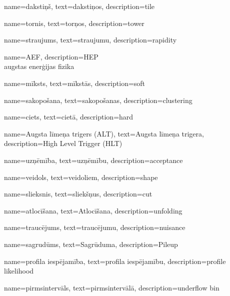 {
        name=dakstiņš,
        text=dakstiņos,
        description={tile}
}


{
        name=tornis,
        text=torņos,
        description={tower}
}


{
        name=straujums,
        text=straujumu,
        description={rapidity}
}

{
        name=AEF,
        description={HEP\\
        augstas enerģijas fizika}
}

{
        name=mīksts,
        text=mīkstās,
        description={soft}
}

{
        name=sakopošana,
        text=sakopošanas,
        description={clustering}
}

{
        name=ciets,
        text=cietā,
        description={hard}
}

{
        name=Augsta līmeņa trigers (ALT),
        text=Augsta līmeņa trigera,
        description={High Level Trigger (HLT)}
}


{
        name=uzņēmība,
        text=uzņēmību,
        description={acceptance}
}

{
        name=veidols,
        text=veidoliem,
        description={shape}
}

{
        name=slieksnis,
        text=sliekšņus,
        description={cut}
}

{
        name=atlocīšana,
        text=Atlocīšana,
        description={unfolding}
}

{
        name=traucējums,
        text=traucējumu,
        description={nuisance}
}

{
        name=sagrudūms,
        text=Sagrūduma,
        description={Pileup}
}

{
        name=profila iespējamība,
        text=profila iespējamību,
        description={profile likelihood}
}

{
        name=pirmsintervāls,
        text=pirmsintervālā,
        description={underflow bin}
}
